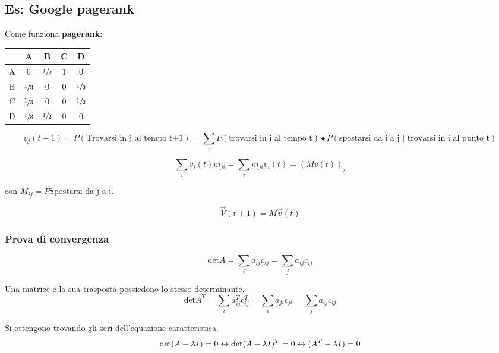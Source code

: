 \documentclass[\main/main.tex]{subfiles}
\begin{document}
\subsection{Es: Google pagerank}
Come funziona \textbf{pagerank}:

\begin{center}
\begin{tabular}{ |c|c|c|c|c| } 
 \hline
  & A & B & C & D \\ 
 \hline
 A & 0 & $\sfrac{1}{2}$ & 1 & 0 \\ 
 \hline
 B & $\sfrac{1}{3}$ & 0 & 0 & $\sfrac{1}{2}$ \\ 
 \hline
 C & $\sfrac{1}{3}$ & 0 & 0 & $\sfrac{1}{2}$ \\ 
 \hline
 D & $\sfrac{1}{3}$ & $\sfrac{1}{2}$ & 0 & 0 \\ 
 \hline
\end{tabular}
\end{center}

\[
	v_j(t+1) = P(\text{Trovarsi in j al tempo t+1}) = \sum_i P (\text{trovarsi in i al tempo t})\bullet P(\text{spostarsi da i a j | trovarsi in i al punto t})
\]

\[
	\sum_i v_i(t) m_{ji} = \sum_i m_{ji}v_i(t) = (Mv(t))_j
\]

con $M_{ij} = P \text{Spostarsi da j a i}$.

\[
	\vec{V}(t+1) = M\vec{v}(t)
\]

\subsubsection{Prova di convergenza}

\begin{definition}[Determinante]
	\[
		\text{det}A = \sum_i a_{ij} c_{ij} = \sum_j a_{ij} c_{ij}	
	\]
\end{definition}

\begin{definition}
Una matrice e la sua trasposta possiedono lo stesso determinante.
	\[
		\text{det}A^T = \sum_i a^T_{ij} c^T_{ij} = \sum_i a_{ji} c_{ji}	 =  \sum_j a_{ij} c_{ij}	
	\]
\end{definition}

\begin{definition}[Autovalori]
Si ottengono trovando gli zeri dell'equazione caratteristica.
\[
	\text{det}(A-\lambda I) = 0 \leftrightarrow \text{det}(A-\lambda I)^T = 0 \leftrightarrow  \text(A^T-\lambda I) = 0
\]
\end{definition}
\end{document}
